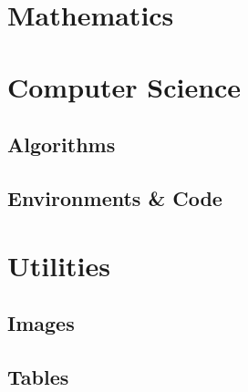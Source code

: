 \documentclass[12pt, letterpaper]{article}
\begin{document}
\section{Mathematics}
\label{maths}
\section{Computer Science}
\label{cs}
	\subsection{Algorithms}
	\subsection{Environments \& Code}
\section{Utilities}
\label{utils}
	\subsection{Images}
	\subsection{Tables}



\end{document}
